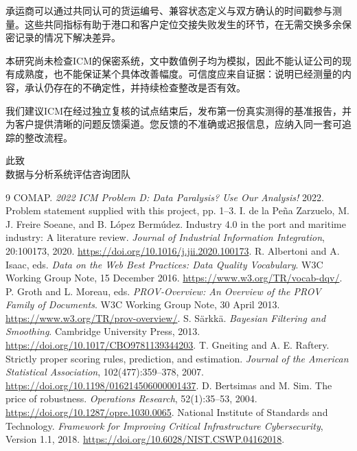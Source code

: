 \begin{minipage}{\linewidth}
{承运商可以通过共同认可的货运编号、兼容状态定义与双方确认的时间戳参与测量。这些共同指标有助于港口和客户定位交接失败发生的环节，在无需交换多余保密记录的情况下解决差异。

本研究尚未检查ICM的保密系统，文中数值例子均为模拟，因此不能认证公司的现有成熟度，也不能保证某个具体改善幅度。可信度应来自证据：说明已经测量的内容，承认仍存在的不确定性，并持续检查整改是否有效。

我们建议ICM在经过独立复核的试点结束后，发布第一份真实测得的基准报告，并为客户提供清晰的问题反馈渠道。您反馈的不准确或迟报信息，应纳入同一套可追踪的整改流程。

\noindent 此致\\数据与分析系统评估咨询团队
}

\ifdefined\ChineseVersion\end{minipage}\par\fi
\clearpage
\renewcommand{\refname}{\bi{References}{参考文献}}
\begin{thebibliography}{9}
 COMAP. \emph{2022 ICM Problem D: Data Paralysis? Use Our Analysis!} 2022. Problem statement supplied with this project, pp. 1--3.
 I. de la Pe\~na Zarzuelo, M. J. Freire Soeane, and B. L\'opez Berm\'udez. Industry 4.0 in the port and maritime industry: A literature review. \emph{Journal of Industrial Information Integration}, 20:100173, 2020. \url{https://doi.org/10.1016/j.jii.2020.100173}.
 R. Albertoni and A. Isaac, eds. \emph{Data on the Web Best Practices: Data Quality Vocabulary}. W3C Working Group Note, 15 December 2016. \url{https://www.w3.org/TR/vocab-dqv/}.
 P. Groth and L. Moreau, eds. \emph{PROV-Overview: An Overview of the PROV Family of Documents}. W3C Working Group Note, 30 April 2013. \url{https://www.w3.org/TR/prov-overview/}.
 S. S\"arkk\"a. \emph{Bayesian Filtering and Smoothing}. Cambridge University Press, 2013. \url{https://doi.org/10.1017/CBO9781139344203}.
 T. Gneiting and A. E. Raftery. Strictly proper scoring rules, prediction, and estimation. \emph{Journal of the American Statistical Association}, 102(477):359--378, 2007. \url{https://doi.org/10.1198/016214506000001437}.
 D. Bertsimas and M. Sim. The price of robustness. \emph{Operations Research}, 52(1):35--53, 2004. \url{https://doi.org/10.1287/opre.1030.0065}.
 National Institute of Standards and Technology. \emph{Framework for Improving Critical Infrastructure Cybersecurity}, Version 1.1, 2018. \url{https://doi.org/10.6028/NIST.CSWP.04162018}.
\end{thebibliography}\par
